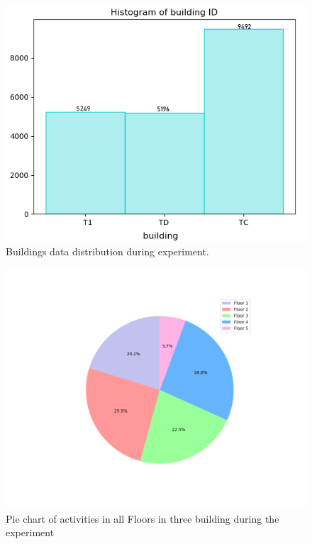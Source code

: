 \begin{figure}
    \centering
    \includegraphics[width = 12 cm]{image/Chapters/Chapter6/buidlingID.png}
    \caption{Buildings data distribution during experiment. }
    \label{bdd}
\end{figure}




\begin{figure}
    \centering
    \includegraphics[width = 12 cm]{image/Chapters/Chapter6/floors.png}
    \caption{Pie chart of activities in all Floors in three building during the experiment }
    \label{Pfloor}
\end{figure}





